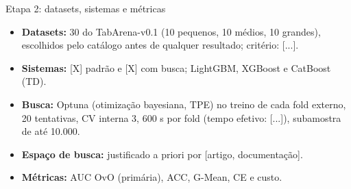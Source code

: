 \documentclass[aspectratio=169,11pt]{beamer}
\begin{document}

\begin{frame}{Etapa 2: datasets, sistemas e métricas}
    \begin{itemize}
        \item \textbf{Datasets:} 30 do TabArena-v0.1 (10 pequenos, 10 médios, 10 grandes), escolhidos pelo catálogo antes de qualquer resultado; critério: [...].
        \item \textbf{Sistemas:} [X] padrão e [X] com busca; LightGBM, XGBoost e CatBoost (TD).
        \item \textbf{Busca:} Optuna (otimização bayesiana, TPE) no treino de cada fold externo, 20 tentativas, CV interna 3, 600 s por fold (tempo efetivo: [...]), subamostra de até 10.000.
        \item \textbf{Espaço de busca:} justificado a priori por [artigo, documentação].
        \item \textbf{Métricas:} AUC OvO (primária), ACC, G-Mean, CE e custo.
    \end{itemize}
\end{frame}
\end{document}
